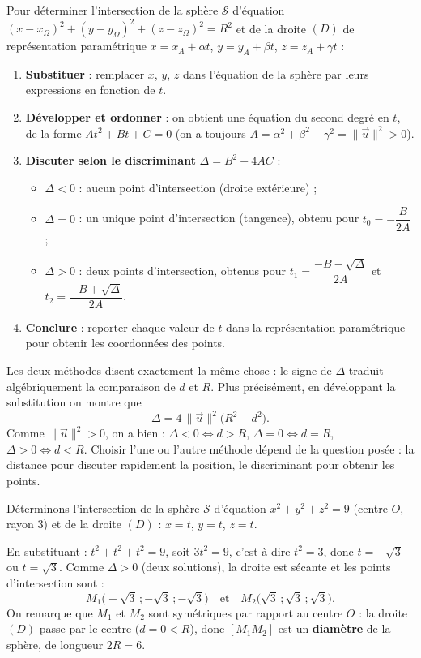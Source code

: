\documentclass[11pt]{article}
\begin{document}
\begin{methode}
Pour déterminer l'intersection de la sphère $\mathcal{S}$ d'équation $(x-x_\Omega)^2+(y-y_\Omega)^2+(z-z_\Omega)^2=R^2$ et de la droite $(D)$ de représentation paramétrique $x=x_A+\alpha t$, $y=y_A+\beta t$, $z=z_A+\gamma t$ :
\begin{enumerate}
\item \textbf{Substituer} : remplacer $x$, $y$, $z$ dans l'équation de la sphère par leurs expressions en fonction de $t$.
\item \textbf{Développer et ordonner} : on obtient une équation du second degré en $t$, de la forme $At^2+Bt+C=0$ (on a toujours $A=\alpha^2+\beta^2+\gamma^2=\|\vec{u}\|^2>0$).
\item \textbf{Discuter selon le discriminant} $\Delta=B^2-4AC$ :
\begin{itemize}
\item $\Delta<0$ : aucun point d'intersection (droite extérieure) ;
\item $\Delta=0$ : un unique point d'intersection (tangence), obtenu pour $t_0=-\dfrac{B}{2A}$ ;
\item $\Delta>0$ : deux points d'intersection, obtenus pour $t_1=\dfrac{-B-\sqrt{\Delta}}{2A}$ et $t_2=\dfrac{-B+\sqrt{\Delta}}{2A}$.
\end{itemize}
\item \textbf{Conclure} : reporter chaque valeur de $t$ dans la représentation paramétrique pour obtenir les coordonnées des points.
\end{enumerate}
\end{methode}

\begin{propriete}
Les deux méthodes disent exactement la même chose : le signe de $\Delta$ traduit algébriquement la comparaison de $d$ et $R$. Plus précisément, en développant la substitution on montre que
\[
\Delta = 4\,\|\vec{u}\|^2\big(R^2-d^2\big).
\]
Comme $\|\vec{u}\|^2>0$, on a bien : $\Delta<0\Leftrightarrow d>R$, $\Delta=0\Leftrightarrow d=R$, $\Delta>0\Leftrightarrow d<R$. Choisir l'une ou l'autre méthode dépend de la question posée : la distance pour discuter rapidement la position, le discriminant pour obtenir les points.
\end{propriete}

\begin{exemplebox}
Déterminons l'intersection de la sphère $\mathcal{S}$ d'équation $x^2+y^2+z^2=9$ (centre $O$, rayon $3$) et de la droite $(D)$ : $x=t$, $y=t$, $z=t$.

En substituant : $t^2+t^2+t^2=9$, soit $3t^2=9$, c'est-à-dire $t^2=3$, donc $t=-\sqrt{3}$ ou $t=\sqrt{3}$. Comme $\Delta>0$ (deux solutions), la droite est sécante et les points d'intersection sont :
\[
M_1\big(-\sqrt{3}\,;-\sqrt{3}\,;-\sqrt{3}\big) \quad\text{et}\quad M_2\big(\sqrt{3}\,;\sqrt{3}\,;\sqrt{3}\big).
\]
On remarque que $M_1$ et $M_2$ sont symétriques par rapport au centre $O$ : la droite $(D)$ passe par le centre ($d=0<R$), donc $[M_1M_2]$ est un \textbf{diamètre} de la sphère, de longueur $2R=6$.
\end{exemplebox}
\end{document}
